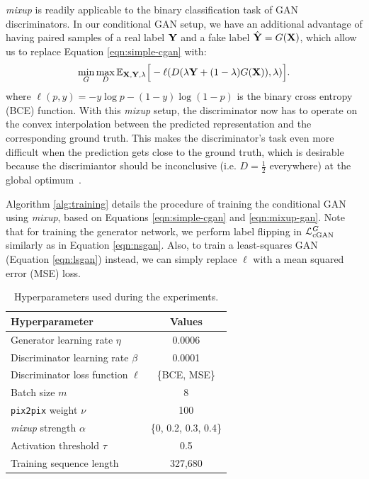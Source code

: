 \textit{mixup} is readily applicable to the binary classification task of GAN discriminators.
In our conditional GAN setup, we have an additional advantage of having paired samples of a real label $\mathbf{Y}$ and a fake label $\hat{\mathbf{Y}} = G(\mathbf{X})$, which allow us to replace Equation \ref{eqn:simple-cgan} with:
\begin{equation}\label{eqn:mixup-gan}
\min_{G} \max_{D} \mathbb{E}_{\mathbf{X},\mathbf{Y},\lambda} \Big [ - \ell (D(\lambda \mathbf{Y} + (1 - \lambda) G(\mathbf{X}) ), \lambda) \Big ].
\end{equation}
where $\ell(p, y) = - y \log p - (1-y) \log (1-p)$ is the binary cross entropy (BCE) function.
With this \textit{mixup} setup, the discriminator now has to operate on the convex interpolation between the predicted representation and the corresponding ground truth.
This makes the discriminator's task even more difficult when the prediction gets close to the ground truth, which is desirable because the discrimiantor should be inconclusive (i.e. $D = \tfrac{1}{2}$ everywhere) at the global optimum~\cite{goodfellow2014gan}.

Algorithm \ref{alg:training} details the procedure of training the conditional GAN using \textit{mixup}, based on Equations \ref{eqn:simple-cgan} and \ref{eqn:mixup-gan}.
Note that for training the generator network, we perform label flipping in $\mathcal{L}_{\text{cGAN}}^G$ similarly as in Equation \ref{eqn:nsgan}.
Also, to train a least-squares GAN (Equation \ref{eqn:lsgan}) instead, we can simply replace $\ell$ with a mean squared error (MSE) loss.


\begin{table}[t]
	\small
	\renewcommand\arraystretch{1.2}
	\renewcommand{\tabcolsep}{5pt}
	\centering
	\begin{tabular}{l c} \toprule
		Hyperparameter & Values \\ \hline
		Generator learning rate $\eta$ & 0.0006 \\ 
		Discriminator learning rate $\beta$ & 0.0001 \\
		Discriminator loss function $\ell$ & \{BCE, MSE\}\\
		Batch size $m$ & 8 \\
		\texttt{pix2pix} weight $\nu$ & 100 \\
		\textit{mixup} strength $\alpha$ & \{0, 0.2, 0.3, 0.4\} \\
		Activation threshold $\tau$ & 0.5 \\
		Training sequence length & 327,680 \\
		\bottomrule
	\end{tabular}
	\vspace{1em}
	\caption{Hyperparameters used during the experiments.}\label{tab:hyperparameters}
\end{table}

